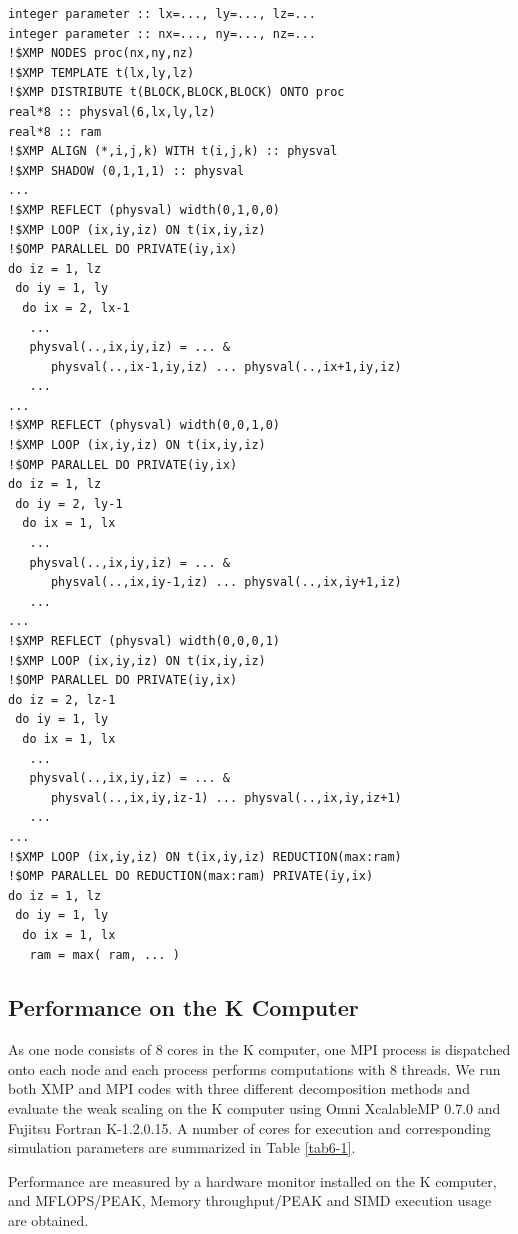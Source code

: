 \documentclass[graybox]{svmult}
\begin{document}
\begin{lstlisting}[caption={Typical XMP programs using the global-view programming model for all of X, Y and Z domain decomposition method.}, label=allxyz]
integer parameter :: lx=..., ly=..., lz=...
integer parameter :: nx=..., ny=..., nz=...
!$XMP NODES proc(nx,ny,nz)
!$XMP TEMPLATE t(lx,ly,lz)
!$XMP DISTRIBUTE t(BLOCK,BLOCK,BLOCK) ONTO proc
real*8 :: physval(6,lx,ly,lz)
real*8 :: ram
!$XMP ALIGN (*,i,j,k) WITH t(i,j,k) :: physval
!$XMP SHADOW (0,1,1,1) :: physval 
...
!$XMP REFLECT (physval) width(0,1,0,0) 
!$XMP LOOP (ix,iy,iz) ON t(ix,iy,iz)
!$OMP PARALLEL DO PRIVATE(iy,ix)
do iz = 1, lz
 do iy = 1, ly
  do ix = 2, lx-1 
   ...
   physval(..,ix,iy,iz) = ... &
      physval(..,ix-1,iy,iz) ... physval(..,ix+1,iy,iz)
   ...
...
!$XMP REFLECT (physval) width(0,0,1,0) 
!$XMP LOOP (ix,iy,iz) ON t(ix,iy,iz)
!$OMP PARALLEL DO PRIVATE(iy,ix)
do iz = 1, lz
 do iy = 2, ly-1
  do ix = 1, lx 
   ...
   physval(..,ix,iy,iz) = ... &
      physval(..,ix,iy-1,iz) ... physval(..,ix,iy+1,iz)
   ...
...
!$XMP REFLECT (physval) width(0,0,0,1) 
!$XMP LOOP (ix,iy,iz) ON t(ix,iy,iz)
!$OMP PARALLEL DO PRIVATE(iy,ix)
do iz = 2, lz-1
 do iy = 1, ly
  do ix = 1, lx 
   ...
   physval(..,ix,iy,iz) = ... &
      physval(..,ix,iy,iz-1) ... physval(..,ix,iy,iz+1)
   ...
...
!$XMP LOOP (ix,iy,iz) ON t(ix,iy,iz) REDUCTION(max:ram)
!$OMP PARALLEL DO REDUCTION(max:ram) PRIVATE(iy,ix)
do iz = 1, lz
 do iy = 1, ly
  do ix = 1, lx 
   ram = max( ram, ... ) 
\end{lstlisting}

\subsection{Performance on the K Computer}
As one node consists of 8 cores in the K computer, one MPI process is dispatched onto each node and each process performs computations with 8 threads. We run both XMP and MPI codes with three different decomposition methods and evaluate the weak scaling on the K computer using Omni XcalableMP 0.7.0 and Fujitsu Fortran K-1.2.0.15. A number of cores for execution and corresponding simulation parameters are summarized in Table \ref{tab6-1}.

Performance are measured by a hardware monitor installed on the K computer, and MFLOPS/PEAK, Memory throughput/PEAK and SIMD execution usage are obtained.
\end{document}
